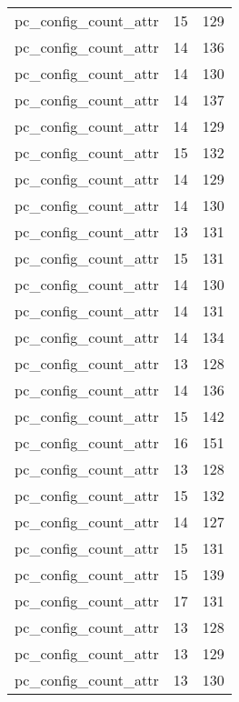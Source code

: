 \begin{table}
\begin{tabular}{lrr}
            pc\_config\_count\_attr &        15 &       129 \\
            pc\_config\_count\_attr &        14 &       136 \\
            pc\_config\_count\_attr &        14 &       130 \\
            pc\_config\_count\_attr &        14 &       137 \\
            pc\_config\_count\_attr &        14 &       129 \\
            pc\_config\_count\_attr &        15 &       132 \\
            pc\_config\_count\_attr &        14 &       129 \\
            pc\_config\_count\_attr &        14 &       130 \\
            pc\_config\_count\_attr &        13 &       131 \\
            pc\_config\_count\_attr &        15 &       131 \\
            pc\_config\_count\_attr &        14 &       130 \\
            pc\_config\_count\_attr &        14 &       131 \\
            pc\_config\_count\_attr &        14 &       134 \\
            pc\_config\_count\_attr &        13 &       128 \\
            pc\_config\_count\_attr &        14 &       136 \\
            pc\_config\_count\_attr &        15 &       142 \\
            pc\_config\_count\_attr &        16 &       151 \\
            pc\_config\_count\_attr &        13 &       128 \\
            pc\_config\_count\_attr &        15 &       132 \\
            pc\_config\_count\_attr &        14 &       127 \\
            pc\_config\_count\_attr &        15 &       131 \\
            pc\_config\_count\_attr &        15 &       139 \\
            pc\_config\_count\_attr &        17 &       131 \\
            pc\_config\_count\_attr &        13 &       128 \\
            pc\_config\_count\_attr &        13 &       129 \\
            pc\_config\_count\_attr &        13 &       130 \\

\end{tabular}
\end{table}
